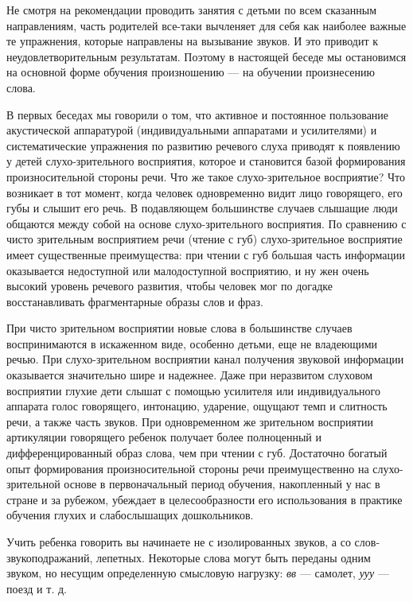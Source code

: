 \documentclass{book}
\renewcommand{\emph}[1]{\textit{#1}}
\begin{document}
Не смотря на рекомендации проводить занятия с детьми по всем сказанным
направлениям, часть родителей все-таки вычленяет для себя как наиболее
важные те упражнения, которые направлены на вызывание звуков. И это
приводит к неудовлетворительным результатам. Поэтому в настоящей беседе
мы остановимся на основной форме обучения произношению --- на обучении
произнесению слова.

В первых беседах мы говорили о том, что активное и постоянное
пользование акустической аппаратурой (индивидуальными аппаратами и
усилителями) и систематические упражнения по развитию речевого слуха
приводят к появлению у детей слухо-зрительного восприятия, которое и
становится базой формирования произносительной стороны речи. Что же
такое слухо-зрительное восприятие? Что возникает в тот момент, когда
человек одновременно видит лицо говорящего, его губы и слышит его речь.
В подавляющем большинстве случаев слышащие люди общаются между собой на
основе слухо-зрительного восприятия. По сравнению с чисто зрительным
восприятием речи (чтение с губ) слухо-зрительное восприятие имеет
существенные преимущества: при чтении с губ большая часть информации
оказывается недоступной или малодоступной восприятию, и ну жен очень
высокий уровень речевого развития, чтобы человек мог по догадке
восстанавливать фрагментарные образы слов и фраз.

При чисто зрительном восприятии новые слова в большинстве случаев
воспринимаются в искаженном виде, особенно детьми, еще не владеющими
речью. При слухо-зрительном восприятии канал получения звуковой
информации оказывается значительно шире и надежнее. Даже при неразвитом
слуховом восприятии глухие дети слышат с помощью усилителя или
индивидуального аппарата голос говорящего, интонацию, ударение, ощущают
темп и слитность речи, а также часть звуков. При одновременном же
зрительном восприятии артикуляции говорящего ребенок получает более
полноценный и дифференцированный образ слова, чем при чтении с губ.
Достаточно богатый опыт формирования произносительной стороны речи
преимущественно на слухо-зрительной основе в первоначальный период
обучения, накопленный у нас в стране и за рубежом, убеждает в
целесообразности его использования в практике обучения глухих и
слабослышащих дошкольников.

Учить ребенка говорить вы начинаете не с изолированных звуков, а со
слов-звукоподражаний, лепетных. Некоторые слова могут быть переданы
одним звуком, но несущим определенную смысловую нагрузку: \emph{вв} ---
самолет, \emph{ууу} --- поезд и т. д.
\end{document}
